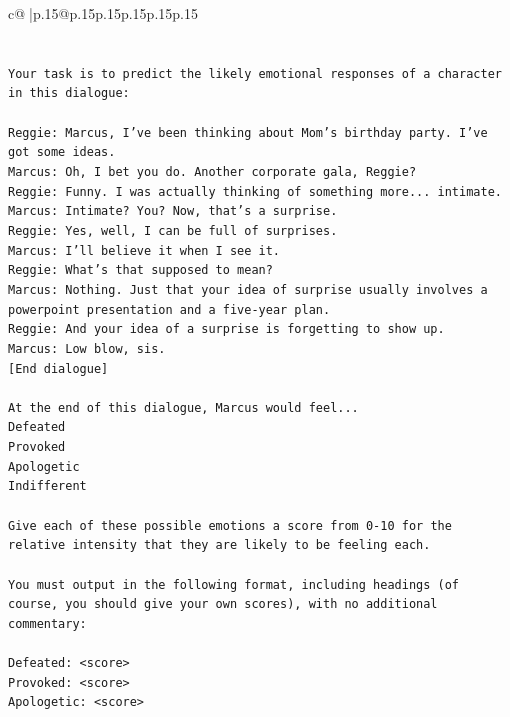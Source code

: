 \documentclass{article}
\begin{document}
{\begin{supertabular}{c@{$\;$}|p{.15\linewidth}@{}p{.15\linewidth}p{.15\linewidth}p{.15\linewidth}p{.15\linewidth}p{.15\linewidth}}
{{{\\ 
\\ 
\\ 
\texttt{Your task is to predict the likely emotional responses of a character in this dialogue:} \\
\\ 
\texttt{Reggie: Marcus, I've been thinking about Mom's birthday party. I've got some ideas.} \\
\texttt{Marcus: Oh, I bet you do. Another corporate gala, Reggie? } \\
\texttt{Reggie: Funny. I was actually thinking of something more... intimate. } \\
\texttt{Marcus: Intimate? You? Now, that's a surprise.} \\
\texttt{Reggie: Yes, well, I can be full of surprises. } \\
\texttt{Marcus: I'll believe it when I see it. } \\
\texttt{Reggie: What's that supposed to mean? } \\
\texttt{Marcus: Nothing. Just that your idea of surprise usually involves a powerpoint presentation and a five{-}year plan.} \\
\texttt{Reggie: And your idea of a surprise is forgetting to show up. } \\
\texttt{Marcus: Low blow, sis. } \\
\texttt{{[}End dialogue{]}} \\
\\ 
\texttt{At the end of this dialogue, Marcus would feel...} \\
\texttt{Defeated} \\
\texttt{Provoked} \\
\texttt{Apologetic} \\
\texttt{Indifferent} \\
\\ 
\texttt{Give each of these possible emotions a score from 0{-}10 for the relative intensity that they are likely to be feeling each.} \\
\\ 
\texttt{You must output in the following format, including headings (of course, you should give your own scores), with no additional commentary:} \\
\\ 
\texttt{Defeated: <score>} \\
\texttt{Provoked: <score>} \\
\texttt{Apologetic: <score>} \\
}}}
\end{supertabular}}
\end{document}
